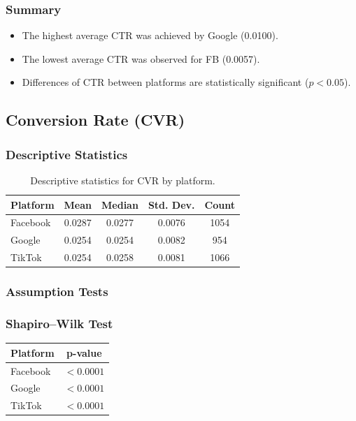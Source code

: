 \subsubsection{Summary}
\begin{itemize}
	\item The highest average CTR was achieved by Google (0.0100).
	\item The lowest average CTR was observed for FB (0.0057).
	\item Differences of CTR between platforms are statistically significant ($p<0.05$).
\end{itemize}

\subsection{Conversion Rate (CVR)} \label{appendix:platform_performance_analysis_CVR}

\subsubsection{Descriptive Statistics}

\begin{table}[H]
	\centering
	\caption{Descriptive statistics for CVR by platform.}
	\begin{tabular}{lcccc}
		\toprule
		Platform & Mean & Median & Std. Dev. & Count \\
		\midrule
		Facebook & 0.0287 & 0.0277 & 0.0076 & 1054 \\
		Google   & 0.0254 & 0.0254 & 0.0082 & 954 \\
		TikTok   & 0.0254 & 0.0258 & 0.0081 & 1066 \\
		\bottomrule
	\end{tabular}
\end{table}

\subsubsection{Assumption Tests}

\subsubsection{Shapiro--Wilk Test}

\begin{table}[H]
	\centering
	\begin{tabular}{lc}
		\toprule
		Platform & p-value \\
		\midrule
		Facebook & $<0.0001$ \\
		Google & $<0.0001$ \\
		TikTok & $<0.0001$ \\
		\bottomrule
	\end{tabular}
\end{table}

